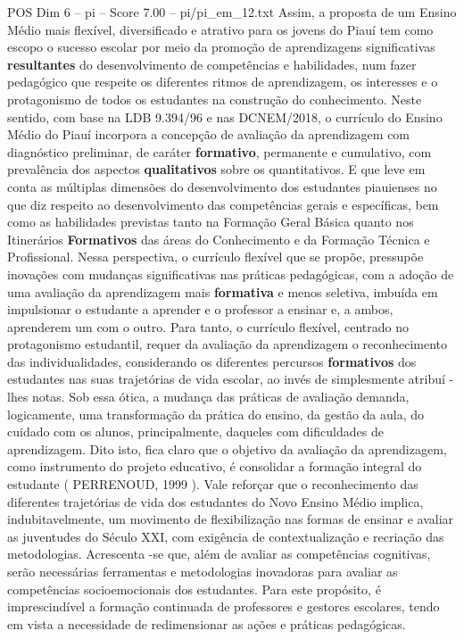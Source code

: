\begin{textsample}{POS Dim 6 – pi – Score 7.00 – pi/pi\_em\_12.txt}
Assim, a proposta de um Ensino Médio mais flexível, diversificado e atrativo para os jovens do Piauí tem como escopo o sucesso escolar por meio da promoção de aprendizagens significativas \textbf{resultantes} do desenvolvimento de competências e habilidades, num fazer pedagógico que respeite os diferentes ritmos de aprendizagem, os interesses e o protagonismo de todos os estudantes na construção do conhecimento.
Neste sentido, com base na LDB 9.394/96 e nas DCNEM/2018, o currículo do Ensino Médio do Piauí incorpora a concepção de avaliação da aprendizagem com diagnóstico preliminar, de caráter \textbf{formativo}, permanente e cumulativo, com prevalência dos aspectos \textbf{qualitativos} sobre os quantitativos.
E que leve em conta as múltiplas dimensões do desenvolvimento dos estudantes piauienses no que diz respeito ao desenvolvimento das competências gerais e específicas, bem como as habilidades previstas tanto na Formação Geral Básica quanto nos Itinerários \textbf{Formativos} das áreas do Conhecimento e da Formação Técnica e Profissional.
Nessa perspectiva, o currículo flexível que se propõe, pressupõe inovações com mudanças significativas nas práticas pedagógicas, com a adoção de uma avaliação da aprendizagem mais \textbf{formativa} e menos seletiva, imbuída em impulsionar o estudante a aprender e o professor a ensinar e, a ambos, aprenderem um com o outro.
Para tanto, o currículo flexível, centrado no protagonismo estudantil, requer da avaliação da aprendizagem o reconhecimento das individualidades, considerando os diferentes percursos \textbf{formativos} dos estudantes nas suas trajetórias de vida escolar, ao invés de simplesmente atribuí -lhes notas.
Sob essa ótica, a mudança das práticas de avaliação demanda, logicamente, uma transformação da prática do ensino, da gestão da aula, do cuidado com os alunos, principalmente, daqueles com dificuldades de aprendizagem.
Dito isto, fica claro que o objetivo da avaliação da aprendizagem, como instrumento do projeto educativo, é consolidar a formação integral do estudante ( PERRENOUD, 1999 ).
Vale reforçar que o reconhecimento das diferentes trajetórias de vida dos estudantes do Novo Ensino Médio implica, indubitavelmente, um movimento de flexibilização nas formas de ensinar e avaliar as juventudes do Século XXI, com exigência de contextualização e recriação das metodologias.
Acrescenta -se que, além de avaliar as competências cognitivas, serão necessárias ferramentas e metodologias inovadoras para avaliar as competências socioemocionais dos estudantes.
Para este propósito, é imprescindível a formação continuada de professores e gestores escolares, tendo em vista a necessidade de redimensionar as ações e práticas pedagógicas.

\end{textsample}
